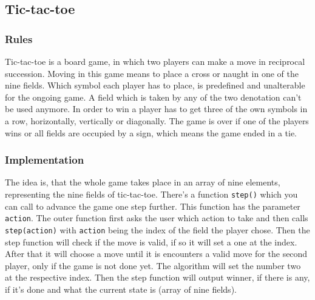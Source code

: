\documentclass[12pt]{article}
\begin{document}
\subsection{Tic-tac-toe}
\subsubsection{Rules}
Tic-tac-toe is a board game, in which two players can make a move in reciprocal succession. Moving in this game means to place a cross or naught in one of the nine fields. Which symbol each player has to place, is predefined and unalterable for the ongoing game. A field which is taken by any of the two denotation can't be used anymore. In order to win a player has to get three of the own symbols in a row, horizontally, vertically or diagonally. The game is over if one of the players wins or all fields are occupied by a sign, which means the game ended in a tie.
\subsubsection{Implementation}\label{sssec:impl}
The idea is, that the whole game takes place in an array of nine elements, representing the nine fields of tic-tac-toe. There's a function \lstinline{step()} which you can call to advance the game one step further. This function has the parameter \lstinline{action}. The outer function first asks the user which action to take and then calls \lstinline{step(action)} with \lstinline{action} being the index of the field the player chose. Then the step function will check if the move is valid, if so it will set a one at the index. After that it will choose a move until it is encounters a valid move for the second player, only if the game is not done yet. The algorithm will set the number two at the respective index. Then the step function will output winner, if there is any, if it's done and what the current state is (array of nine fields).
\end{document}
